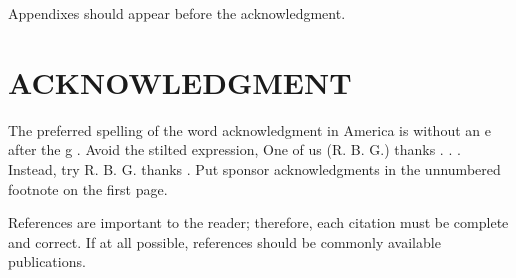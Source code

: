 \documentclass[a4paper, 10pt, conference]{ieeeconf}
\begin{document}
Appendixes should appear before the acknowledgment.

\section*{ACKNOWLEDGMENT}

The preferred spelling of the word acknowledgment in America is without an e after the g . Avoid the stilted expression, One of us (R. B. G.) thanks . . . Instead, try R. B. G. thanks . Put sponsor acknowledgments in the unnumbered footnote on the first page.




References are important to the reader; therefore, each citation must be complete and correct. If at all possible, references should be commonly available publications.
\end{document}
